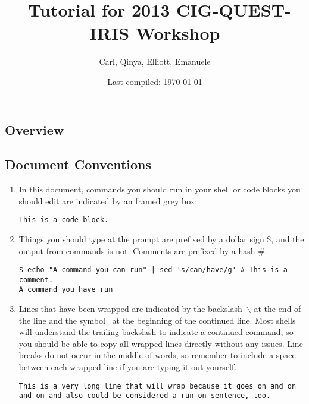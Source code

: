 \documentclass[10pt,fleqn,letterpaper]{article}
\title{\specfem\ Tutorial for 2013 CIG-QUEST-IRIS Workshop}
\author{Carl, Qinya, Elliott, Emanuele}
\date{Last compiled: \today}
\begin{document}

\maketitle



\subsection*{Overview}


\subsection*{Document Conventions}

\begin{enumerate}
\item In this document, commands you should run in your shell or code blocks
      you should edit are indicated by an framed grey box:
\begin{lstlisting}
This is a code block.
\end{lstlisting}

\item Things you should type at the prompt are prefixed by a dollar sign \$,
      and the output from commands is not. Comments are prefixed by a hash \#.
\begin{lstlisting}
$ echo "A command you can run" | sed 's/can/have/g' # This is a comment.
A command you have run
\end{lstlisting}

\item Lines that have been wrapped are indicated by the backslash~$\backslash$ at the
      end of the line and the symbol~{\color{red}}
      at the beginning of the continued line. Most shells will understand the trailing
      backslash to indicate a continued command, so you should be able to copy all
      wrapped lines directly without any issues. Line breaks do not occur in the
      middle of words, so remember to include a space between each wrapped line if
      you are typing it out yourself.
\begin{lstlisting}
This is a very long line that will wrap because it goes on and on and on and also could be considered a run-on sentence, too.
\end{lstlisting}
\end{enumerate}
\end{document}
